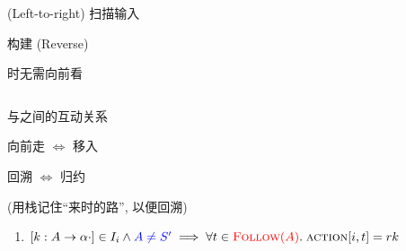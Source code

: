 \begin{frame}{}
  \begin{center}

    \vspace{0.80cm}
    \begin{columns}
        \begin{description}
          \setlength{\itemsep}{15pt}
          \item[$L:$]  (Left-to-right) 扫描输入
          \item[$R:$] 构建 (Reverse) 
          \item[$0:$] 时无需向前看
        \end{description}
    \end{columns}
  \end{center}
\end{frame}

\begin{frame}{}
  \begin{center}
    与之间的互动关系

    \vspace{0.80cm}
    向前走 $\Leftrightarrow$ 移入

    \vspace{0.50cm}
    回溯   $\Leftrightarrow$ 归约

    \vspace{1.00cm}

    \vspace{0.20cm}
    (用栈记住``来时的路'', 以便回溯)
  \end{center}
\end{frame}

%

\begin{frame}{}
  \begin{center}


    \begin{enumerate}[(3)]
      \centering
      \item $[k: A \to \alpha \cdot] \in I_{i} \land \textcolor{blue}{A \neq S'} \implies
        \forall t \in \textcolor{red}{\textsc{Follow}(A)}.\; \textsc{action}[i, t] = rk$
    \end{enumerate}
  \end{center}
\end{frame}

